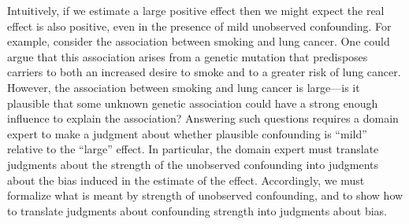 \documentclass{article}
\begin{document}
Intuitively, if we estimate a large positive effect then we might expect the real effect is also positive,
even in the presence of mild unobserved confounding.
For example, consider the association between smoking and lung cancer.
One could argue that this association arises from a genetic mutation that predisposes
carriers to both an increased desire to smoke and to a greater risk of lung cancer.
However, the association between smoking and lung cancer is large---is it plausible that
some unknown genetic association could have a strong enough influence to explain the association?
Answering such questions requires a domain expert to make a judgment about whether plausible
confounding is ``mild'' relative to the ``large'' effect.
In particular, the domain expert must translate judgments about the strength
of the unobserved confounding into judgments about the bias induced in the estimate of the effect.
Accordingly,
we must formalize what is meant by strength of unobserved confounding,
and to show how to translate judgments about confounding strength into judgments about bias.
\end{document}
